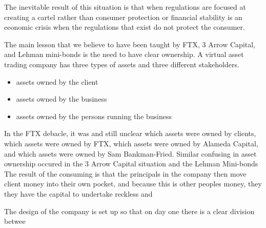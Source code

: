 The inevitable result of this situation is that when regulations are
focused at creating a cartel rather than consumer protection or
financial stability is an economic crisis when the regulations that
exist do not protect the consumer.

The main lesson that we believe to have been taught by FTX, 3 Arrow
Capital, and Lehman mini-bonds is the need to have clear ownership.  A
virtual asset trading company has three types of assets and three 
different stakeholders.

\begin{itemize}
\item assets owned by the client
\item assets owned by the business
\item assets owned by the persons running the business
\end{itemize}

In the FTX debacle, it was and still unclear which assets were owned
by clients, which assets were owned by FTX, which assets were owned by
Alameda Capital, and which assets were owned by Sam Bankman-Fried.
Similar confusing in asset ownership occured in the 3 Arrow Capital
situation and the Lehman Mini-bonds   The result of the consuming is
that the principals in the company then move client money into their
own pocket, and because this is other peoples money, they they have
the capital to undertake reckless and 

The design of the company is set up so that on day one there is a
clear division betwee
